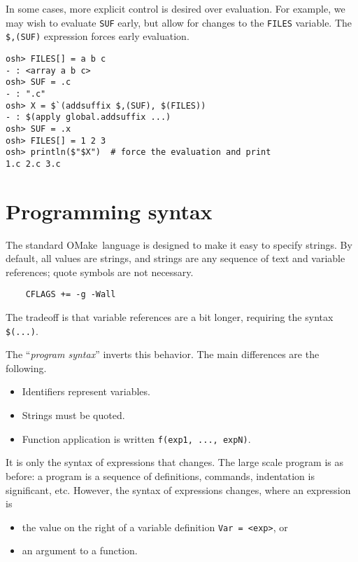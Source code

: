 In some cases, more explicit control is desired over evaluation.  For example, we may wish to
evaluate \verb+SUF+ early, but allow for changes to the \verb+FILES+ variable.  The \verb+$,(SUF)+
expression forces early evaluation.

\begin{verbatim}
osh> FILES[] = a b c
- : <array a b c>
osh> SUF = .c
- : ".c"
osh> X = $`(addsuffix $,(SUF), $(FILES))
- : $(apply global.addsuffix ...)
osh> SUF = .x
osh> FILES[] = 1 2 3
osh> println($"$X")  # force the evaluation and print
1.c 2.c 3.c
\end{verbatim}

\section{Programming syntax}
\label{section:program-syntax}

\newinkeyword

The standard OMake~language is designed to make it easy to specify strings.  By default, all values
are strings, and strings are any sequence of text and variable references; quote symbols are not
necessary.

\begin{verbatim}
    CFLAGS += -g -Wall
\end{verbatim}

The tradeoff is that variable references are a bit longer, requiring the syntax \verb+$(...)+.

The ``\emph{program syntax}'' inverts this behavior.  The main differences are the following.

\begin{itemize}
\item Identifiers represent variables.
\item Strings must be quoted.
\item Function application is written \verb+f(exp1, ..., expN)+.
\end{itemize}

It is only the syntax of expressions that changes.  The large scale
program is as before: a program is a sequence of definitions,
commands, indentation is significant, etc.  However, the syntax of
expressions changes, where an expression is

\begin{itemize}
\item the value on the right of a variable definition
  \verb+Var = <exp>+, or
\item an argument to a function.
\end{itemize}

